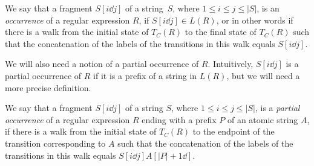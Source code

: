 \begin{definition}
We say that a fragment $S[i \dd j]$ of a string~$S$, where $1\le i\le j \le |S|$, is an \emph{occurrence} of a regular expression $R$, if $S[i \dd j] \in L(R)$, or in other words if there is a walk from the initial state of $T_C(R)$ to the final state of $T_C(R)$ such that the concatenation of the labels of the transitions in this walk equals $S[i \dd j]$.
\end{definition}

We will also need a notion of a partial occurrence of $R$. Intuitively, $S[i \dd j]$ is a partial occurrence of $R$ if it is a prefix of a string in $L(R)$, but we will need a more precise definition.

\begin{definition}
We say that a fragment $S[i \dd j]$ of a string $S$, where $1\le i\le j \le |S|$, is a \emph{partial occurrence} of a regular expression $R$ ending with a prefix $P$ of an atomic string $A$, if there is a walk from the initial state of $T_C(R)$ to the endpoint of the transition corresponding to $A$ such that the concatenation of the labels of the transitions in this walk equals $S[i \dd j] A[|P|+1\dd]$. 
\end{definition}
